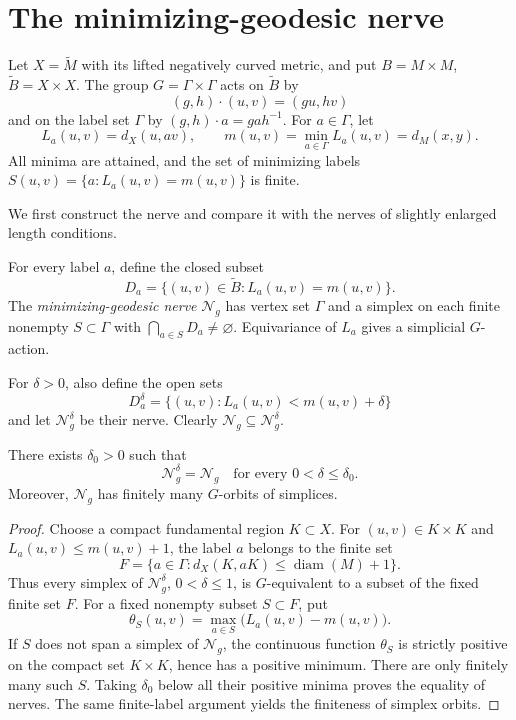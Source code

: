 \section{The minimizing-geodesic nerve}
\label{sec:nerve}

Let $X=\widetilde M$ with its lifted negatively curved metric,
and put $B=M\times M$, $\widetilde B=X\times X$.
The group $G=\Gamma\times\Gamma$ acts on $\widetilde B$ by
\[
 (g,h)\cdot(u,v)=(gu,hv)
\]
and on the label set $\Gamma$ by
$(g,h)\cdot a=gah^{-1}$.
For $a\in\Gamma$, let
\[
 L_a(u,v)=d_X(u,av),\qquad
 m(u,v)=\min_{a\in\Gamma}L_a(u,v)=d_M(x,y).
\]
All minima are attained, and the set of minimizing labels
$S(u,v)=\{a:L_a(u,v)=m(u,v)\}$ is finite.

We first construct the nerve and compare it with the nerves of slightly enlarged length conditions.

For every label $a$, define the closed subset
\[
 D_a=\{(u,v)\in\widetilde B:L_a(u,v)=m(u,v)\}.
\]
The \emph{minimizing-geodesic nerve} $\mathcal N_g$
has vertex set $\Gamma$ and a simplex on each finite
nonempty $S\subset\Gamma$ with
$\bigcap_{a\in S}D_a\ne\varnothing$.
Equivariance of $L_a$ gives a simplicial $G$-action.

For $\delta>0$, also define the open sets
\[
 D_a^\delta=\{(u,v):L_a(u,v)<m(u,v)+\delta\}
\]
and let $\mathcal N_g^\delta$ be their nerve.
Clearly $\mathcal N_g\subseteq\mathcal N_g^\delta$.

\begin{lemma}\label{lem:uniform-allowance}
There exists $\delta_0>0$ such that
\[
 \mathcal N_g^\delta=\mathcal N_g
 \quad\text{for every }0<\delta\leq\delta_0.
\]
Moreover, $\mathcal N_g$ has finitely many $G$-orbits of simplices.
\end{lemma}

\begin{proof}
Choose a compact fundamental region $K\subset X$.
For $(u,v)\in K\times K$ and $L_a(u,v)\leq m(u,v)+1$,
the label $a$ belongs to the finite set
\[
 F=\{a\in\Gamma:d_X(K,aK)\leq\operatorname{diam}(M)+1\}.
\]
Thus every simplex of $\mathcal N_g^\delta$,
$0<\delta\leq1$, is $G$-equivalent to a subset
of the fixed finite set $F$.
For a fixed nonempty subset $S\subset F$, put
\[
 \theta_S(u,v)=\max_{a\in S}\bigl(L_a(u,v)-m(u,v)\bigr).
\]
If $S$ does not span a simplex of $\mathcal N_g$,
the continuous function $\theta_S$ is strictly positive
on the compact set $K\times K$, hence has a positive minimum.
There are only finitely many such $S$. Taking $\delta_0$
below all their positive minima proves the equality
of nerves. The same finite-label argument yields the
finiteness of simplex orbits.
\end{proof}


